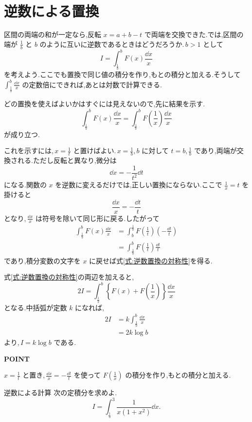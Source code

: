 \section{逆数による置換}\label{節:逆数対称性}

区間の両端の和が一定なら,反転 $x=a+b-t$ で両端を交換できた.では,区間の端が $\frac1b$ と $b$ のように互いに逆数であるときはどうだろうか.\,$b>1$ として
\[
I=\int_{\frac1b}^b F(x)\frac{\dd x}{x}
\]
を考えよう.ここでも置換で同じ値の積分を作り,もとの積分と加える.そうして $\int_{\frac1b}^b\frac{\dd x}{x}$ の定数倍にできれば,あとは対数で計算できる.

どの置換を使えばよいかはすぐには見えないので,先に結果を示す.
\begin{equation}\label{式:逆数置換の対称性}
\int_{\frac1b}^b F(x)\frac{\dd x}{x}
 =\int_{\frac1b}^b F\left(\frac1x\right)\frac{\dd x}{x}
\end{equation}
が成り立つ.

これを示すには,\,$x=\frac1t$ と置けばよい.\,$x=\frac1b,b$ に対して $t=b,\frac1b$ であり,両端が交換される.ただし反転と異なり,微分は
\[
\dd x=-\frac{1}{t^2}\dd t
\]
になる.関数の $x$ を逆数に変えるだけでは,正しい置換にならない.ここで $\frac1x=t$ を掛けると
\[
\frac{\dd x}{x}=-\frac{\dd t}{t}
\]
となり,\,$\frac{\dd x}{x}$ は符号を除いて同じ形に戻る.したがって
\[
\begin{aligned}
\int_{\frac1b}^b F(x)\frac{\dd x}{x}
 &=\int_b^{\frac1b}F\left(\frac1t\right)\left(-\frac{\dd t}{t}\right)\\
 &=\int_{\frac1b}^b F\left(\frac1t\right)\frac{\dd t}{t}
\end{aligned}
\]
であり,積分変数の文字を $x$ に戻せば式\eqref{式:逆数置換の対称性}を得る.

式\eqref{式:逆数置換の対称性}の両辺を加えると,
\[
2I=\int_{\frac1b}^b\left\{F(x)+F\left(\frac1x\right)\right\}\frac{\dd x}{x}
\]
となる.中括弧が定数 $k$ になれば,
\[
\begin{aligned}
2I&=k\int_{\frac1b}^b\frac{\dd x}{x}\\
 &=2k\log b
\end{aligned}
\]
より,\,$I=k\log b$ である.

\begin{bookpoint}
\textbf{POINT}\par
$x=\frac1t$ と置き,\,$\frac{\dd x}{x}=-\frac{\dd t}{t}$ を使って $F\left(\frac1x\right)$ の積分を作り,もとの積分と加える.
\end{bookpoint}

\begin{example}{逆数による計算}
次の定積分を求めよ.
\[
I=\int_{\frac13}^3\frac{1}{x(1+x^2)}\dd x.
\]
\end{example}

